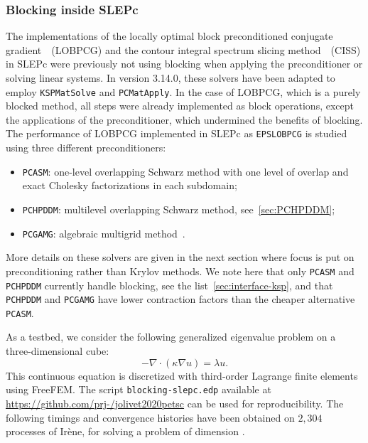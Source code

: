 \documentclass[3p,11pt]{elsarticle}
\newcommand{\pk}[1]{\texttt{#1}}
\begin{document}
\subsubsection{Blocking inside SLEPc\label{sec:lobpcg}}
The implementations of the locally optimal block preconditioned conjugate
gradient~\cite{knyazev2001toward}~(LOBPCG) and the contour integral spectrum
slicing method~\cite{sakurai2003projection}~(CISS) in SLEPc were previously not
using blocking when applying the preconditioner or solving linear systems. In
version 3.14.0, these solvers have been adapted to employ \pk{KSPMatSolve} and
\pk{PCMatApply}.  In the case of LOBPCG, which is a purely blocked method, all
steps were already implemented as block operations, except the applications of
the preconditioner, which undermined the benefits of blocking.
The performance of LOBPCG implemented in SLEPc as \pk{EPSLOBPCG} is studied using three different preconditioners:
\begin{itemize}
    \item \pk{PCASM}: one-level overlapping Schwarz method with one level of overlap and exact Cholesky factorizations in each subdomain;
    \item \pk{PCHPDDM}: multilevel overlapping Schwarz method, see~\cref{sec:PCHPDDM};
    \item \pk{PCGAMG}: algebraic multigrid method~\cite{adams2004ultra}.
\end{itemize}
More details on these solvers are given in the next section where focus is put
on preconditioning rather than Krylov methods.  We note here that only
\pk{PCASM} and \pk{PCHPDDM} currently handle blocking, see the
list~\cref{sec:interface-ksp}, and that \pk{PCHPDDM} and \pk{PCGAMG} have lower
contraction factors than the cheaper alternative \pk{PCASM}.

As a testbed, we consider the following generalized eigenvalue problem on a three-dimensional cube:
\begin{equation*}
    -\nabla \cdot (\kappa \nabla u) = \lambda u.\label{eq:lobpcg}
\end{equation*}
This continuous equation is discretized with third-order Lagrange finite
elements using FreeFEM. The script \texttt{blocking-slepc.edp} available at
\url{https://github.com/prj-/jolivet2020petsc} can be used for reproducibility.
The following timings and convergence histories have been obtained on $2{,}304$
processes of Irène, for solving a problem of dimension
.
\end{document}

